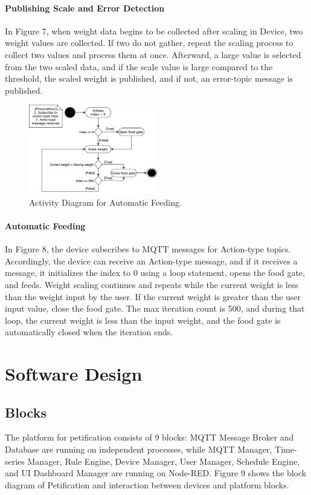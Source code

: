 \documentclass[conference]{IEEEtran}
\begin{document}
\paragraph{Publishing Scale and Error Detection}
In Figure 7, when weight data begins to be collected after scaling in Device, two weight values are collected. If two do not gather, repeat the scaling process to collect two values and process them at once. Afterward, a large value is selected from the two scaled data, and if the scale value is large compared to the threshold, the scaled weight is published, and if not, an error-topic message is published.

\begin{figure}[htbp!]
\centerline{\includegraphics[width=0.5\textwidth]{./images/actionMessageReceived.png}}
\caption{Activity Diagram for Automatic Feeding.}
\label{fig} 
\end{figure}

\paragraph{Automatic Feeding}
In Figure 8, the device subscribes to MQTT messages for Action-type topics.
Accordingly, the device can receive an Action-type message, and if it receives a message, it initializes the index to 0 using a loop statement, opens the food gate, and feeds.
Weight scaling continues and repeats while the current weight is less than the weight input by the user.
If the current weight is greater than the user input value, close the food gate.
The max iteration count is 500, and during that loop, the current weight is less than the input weight, and the food gate is automatically closed when the iteration ends.

\section{Software Design}
\subsection{Blocks}
The platform for petification consists of 9 blocks: MQTT Message Broker and Database are running on independent processes, while MQTT Manager, Time-series Manager, Rule Engine, Device Manager, User Manager, Schedule Engine, and UI Dashboard Manager are running on Node-RED. Figure 9
shows the block diagram of Petification and interaction between devices and platform blocks.
\end{document}

